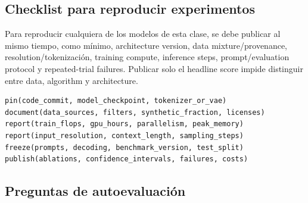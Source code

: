 \subsection{Checklist para reproducir experimentos}

Para reproducir cualquiera de los modelos de esta clase, se debe publicar al mismo tiempo, como mínimo, architecture version, data mixture/provenance, resolution/tokenización, training compute, inference steps, prompt/evaluation protocol y repeated-trial failures. Publicar solo el headline score impide distinguir entre data, algorithm y architecture.

\begin{lstlisting}[caption={Lista unificada de reproducción para LLM/VLM/diffusion}]
pin(code_commit, model_checkpoint, tokenizer_or_vae)
document(data_sources, filters, synthetic_fraction, licenses)
report(train_flops, gpu_hours, parallelism, peak_memory)
report(input_resolution, context_length, sampling_steps)
freeze(prompts, decoding, benchmark_version, test_split)
publish(ablations, confidence_intervals, failures, costs)
\end{lstlisting}

\subsection{Preguntas de autoevaluación}

